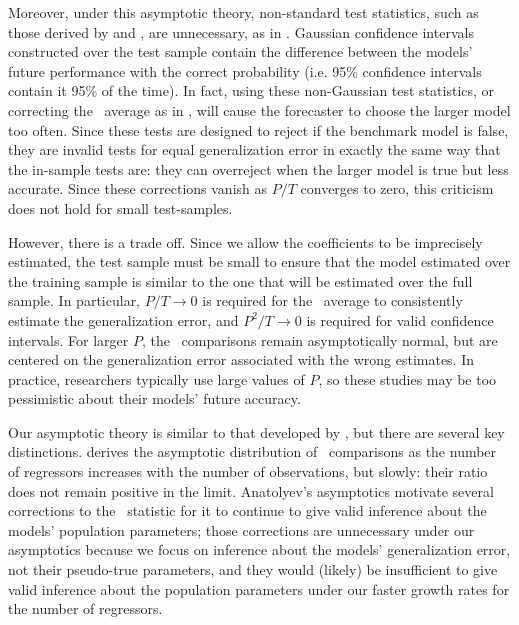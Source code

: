 \documentclass[11pt]{article}
\begin{document}
Moreover, under this asymptotic theory, non-standard test statistics,
such as those derived by \citet{mccracken_asymptotics_2007} and
\cite{clark_tests_2001,clark_evaluating_2005}, are unnecessary, as in
\citet{giacomini_tests_2006}.  Gaussian confidence intervals
constructed over the test sample contain the difference between the
models' future performance with the correct probability (i.e. 95\%
confidence intervals contain it 95\% of the time).  In fact, using
these non-Gaussian test statistics, or correcting the \oos\ average as
in \citet{clark_using_2006,clark_approximately_2007}, will cause the
forecaster to choose the larger model too often.  Since these tests
are designed to reject if the benchmark model is false, they are
invalid tests for equal generalization error in exactly the same way
that the in-sample tests are: they can overreject when the larger model
is true but less accurate.  Since these corrections vanish as $P/T$
converges to zero, this criticism does not hold for small
test-samples.

However, there is a trade off.  Since we allow the coefficients to be
imprecisely estimated, the test sample must be small to ensure that
the model estimated over the training sample is similar to the one
that will be estimated over the full sample.  In particular, $P/T \to
0$ is required for the \oos\ average to consistently estimate the
generalization error, and $P^2/T \to 0$ is required for valid
confidence intervals.  For larger $P$, the \oos\ comparisons remain
asymptotically normal, but are centered on the generalization error
associated with the wrong estimates.
In practice, researchers typically use large values of $P$, so these
studies may be too pessimistic about their models' future accuracy.

Our asymptotic theory is similar to that developed by
\citet{anatolyev_inference_2008}, but there are several key
distinctions.  \citet{anatolyev_inference_2008} derives the asymptotic
distribution of \oos\ comparisons as the number of regressors
increases with the number of observations, but slowly: their ratio
does not remain positive in the limit.  Anatolyev's asymptotics
motivate several corrections to the \oos\ statistic for it to continue
to give valid inference about the models' population parameters; those
corrections are unnecessary under our asymptotics because we focus on
inference about the models' generalization error, not their
pseudo-true parameters, and they would (likely) be insufficient to
give valid inference about the population parameters under our faster
growth rates for the number of regressors.
\end{document}
